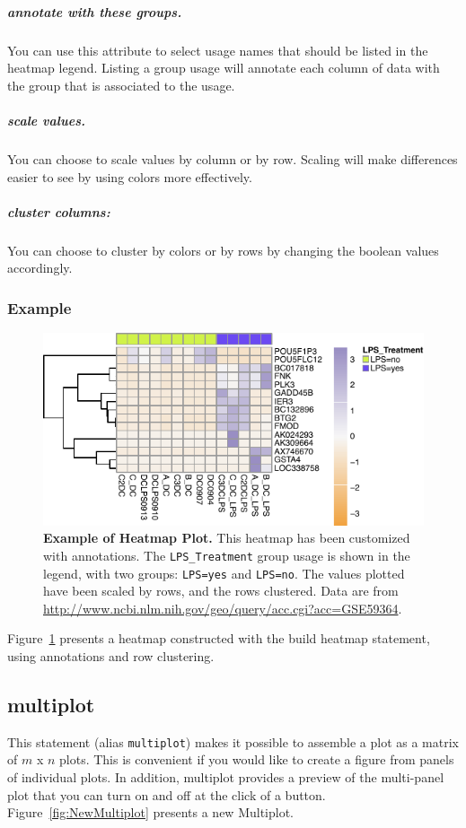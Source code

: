 \subparagraph{\textbf{annotate with these groups.}} You can use this attribute to select usage names that should be listed in the heatmap legend. Listing a group usage will annotate each column of data with the group that is associated to the usage.
\subparagraph{\textbf{scale values.}} You can choose to scale values by column or by row. Scaling will make differences easier to see by using colors more effectively.
\subparagraph{\textbf{cluster columns:}} You can choose to cluster by colors or by rows by changing the boolean values accordingly.

\subsubsection{Example}

\begin{figure}[h!tbp]
  \centering
  \includegraphics[width=\figWidthWide]{figures/heatmap_Example.pdf}
\caption[Example of Heatmap Plot.]{\textbf{Example of Heatmap Plot.} This heatmap has been customized with annotations. The \texttt{LPS\_Treatment} group usage is shown in the legend, with two groups: \texttt{LPS=yes} and \texttt{LPS=no}. The values plotted have been scaled by rows, and the rows clustered. Data are from \url{http://www.ncbi.nlm.nih.gov/geo/query/acc.cgi?acc=GSE59364}.}
\label{fig:ExampleHeatmapPlot}
\end{figure}

Figure~\ref{fig:ExampleHeatmapPlot} presents a heatmap constructed with the build heatmap statement, using annotations and row clustering. 

\subsection{multiplot}
This statement (alias \texttt{multiplot}) makes it possible to assemble a plot as a matrix of $m$ x $n$ plots. This is convenient if you would like to create a figure from panels of individual plots. In addition, multiplot provides a preview of the multi-panel plot that you can turn on and off at the click of a button. Figure~\ref{fig:NewMultiplot} presents a new Multiplot.


